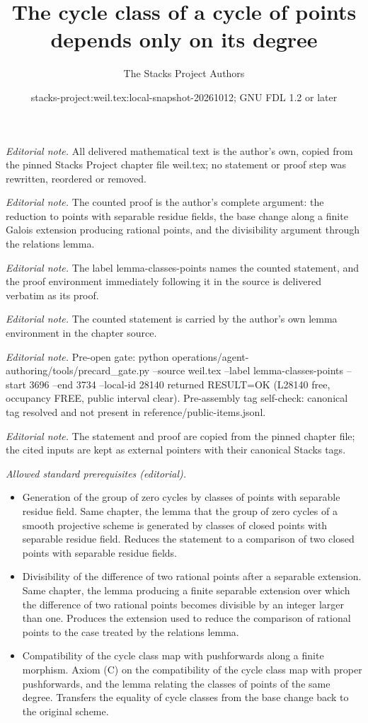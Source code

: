 \documentclass[10pt,a4paper]{amsart}
\title{The cycle class of a cycle of points depends only on its degree}
\author{The Stacks Project Authors}
\date{stacks-project:weil.tex:local-snapshot-20261012; GNU FDL 1.2 or later}
\theoremstyle{plain}
\theoremstyle{definition}
\theoremstyle{remark}
\numberwithin{equation}{subsection}
\begin{document}
\maketitle
\noindent\textit{Editorial note.} All delivered mathematical text is the author's own, copied from the pinned Stacks Project chapter file weil.tex; no statement or proof step was rewritten, reordered or removed.\par\medskip
\noindent\textit{Editorial note.} The counted proof is the author's complete argument: the reduction to points with separable residue fields, the base change along a finite Galois extension producing rational points, and the divisibility argument through the relations lemma.\par\medskip
\noindent\textit{Editorial note.} The label lemma-classes-points names the counted statement, and the proof environment immediately following it in the source is delivered verbatim as its proof.\par\medskip
\noindent\textit{Editorial note.} The counted statement is carried by the author's own lemma environment in the chapter source.\par\medskip
\noindent\textit{Editorial note.} Pre-open gate: python operations/agent-authoring/tools/precard\_gate.py --source weil.tex --label lemma-classes-points --start 3696 --end 3734 --local-id 28140 returned RESULT=OK (L28140 free, occupancy FREE, public interval clear). Pre-assembly tag self-check: canonical tag resolved and not present in reference/public-items.jsonl.\par\medskip
\noindent\textit{Editorial note.} The statement and proof are copied from the pinned chapter file; the cited inputs are kept as external pointers with their canonical Stacks tags.\par\medskip
\noindent\textit{Allowed standard prerequisites (editorial).}\begin{itemize}
\item Generation of the group of zero cycles by classes of points with separable residue field. Same chapter, the lemma that the group of zero cycles of a smooth projective scheme is generated by classes of closed points with separable residue field. Reduces the statement to a comparison of two closed points with separable residue fields.
\item Divisibility of the difference of two rational points after a separable extension. Same chapter, the lemma producing a finite separable extension over which the difference of two rational points becomes divisible by an integer larger than one. Produces the extension used to reduce the comparison of rational points to the case treated by the relations lemma.
\item Compatibility of the cycle class map with pushforwards along a finite morphism. Axiom (C) on the compatibility of the cycle class map with proper pushforwards, and the lemma relating the classes of points of the same degree. Transfers the equality of cycle classes from the base change back to the original scheme.
\end{itemize}\medskip
\end{document}
